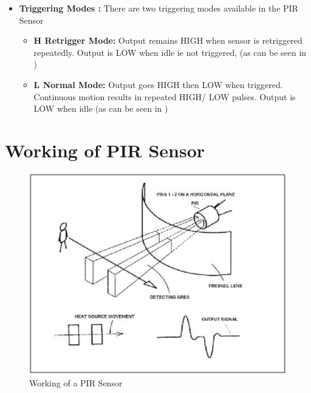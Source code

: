 \documentclass[a4paper,12 pt]{article}
\begin{document}
\begin{itemize}
\item \textbf{Triggering Modes :} There are two triggering modes available in the PIR Sensor

\begin{itemize}
\item \textbf{H Retrigger Mode: }
Output remains HIGH when sensor is retriggered repeatedly. Output is LOW when idle ie not triggered, (as can be seen in )

\item \textbf{L Normal Mode:}
Output goes HIGH then LOW when triggered. Continuous motion results in repeated HIGH/ LOW pulses. Output is LOW when idle (as can be seen in )
\end{itemize}
\end{itemize}

\section{Working of PIR Sensor} 

\begin{figure}[h]
\begin{center}
\includegraphics[]{working.png}
\caption{Working of a PIR Sensor}
\label{fig:7}
\end{center}
\end{figure}
\end{document}
